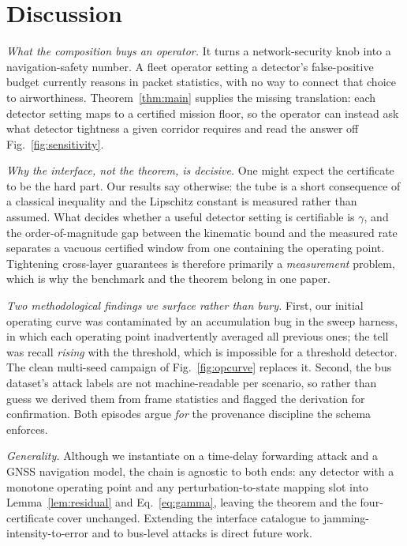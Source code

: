 \section{Discussion}
\label{sec:discussion}
\emph{What the composition buys an operator.} It turns a network-security knob
into a navigation-safety number. A fleet operator setting a detector's
false-positive budget currently reasons in packet statistics, with no way to
connect that choice to airworthiness. Theorem~\ref{thm:main} supplies the
missing translation: each detector setting maps to a certified mission floor, so
the operator can instead ask what detector tightness a given corridor requires
and read the answer off Fig.~\ref{fig:sensitivity}.

\emph{Why the interface, not the theorem, is decisive.} One might expect the
certificate to be the hard part. Our results say otherwise: the tube is a short
consequence of a classical inequality and the Lipschitz constant is measured
rather than assumed. What decides whether a useful detector setting is
certifiable is $\gamma$, and the order-of-magnitude gap between the kinematic
bound and the measured rate separates a vacuous certified window from one
containing the operating point. Tightening cross-layer guarantees is therefore
primarily a \emph{measurement} problem, which is why the benchmark and the
theorem belong in one paper.

\emph{Two methodological findings we surface rather than bury.} First, our
initial operating curve was contaminated by an accumulation bug in the sweep
harness, in which each operating point inadvertently averaged all previous ones;
the tell was recall \emph{rising} with the threshold, which is impossible for a
threshold detector. The clean multi-seed campaign of Fig.~\ref{fig:opcurve}
replaces it. Second, the bus dataset's attack labels are not machine-readable
per scenario, so rather than guess we derived them from frame statistics and
flagged the derivation for confirmation. Both episodes argue \emph{for} the
provenance discipline the schema enforces.

\emph{Generality.} Although we instantiate on a time-delay forwarding attack and
a GNSS navigation model, the chain is agnostic to both ends: any detector with a
monotone operating point and any perturbation-to-state mapping slot into
Lemma~\ref{lem:residual} and Eq.~\eqref{eq:gamma}, leaving the theorem and the
four-certificate cover unchanged. Extending the interface catalogue to
jamming-intensity-to-error and to bus-level attacks is direct future work.


